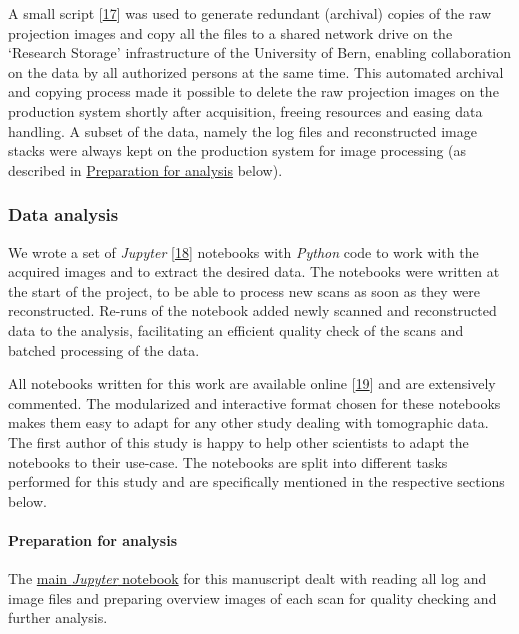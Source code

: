 A small script {[}\protect\hyperlink{ref-ZjgrPHTa}{17}{]} was used to generate redundant (archival) copies of the raw projection images and copy all the files to a shared network drive on the `Research Storage' infrastructure of the University of Bern, enabling collaboration on the data by all authorized persons at the same time.
This automated archival and copying process made it possible to delete the raw projection images on the production system shortly after acquisition, freeing resources and easing data handling.
A subset of the data, namely the log files and reconstructed image stacks were always kept on the production system for image processing (as described in \protect\hyperlink{preparation-for-analysis}{Preparation for analysis} below).

\hypertarget{data-analysis}{%
\subsubsection{Data analysis}\label{data-analysis}}

We wrote a set of \emph{Jupyter} {[}\protect\hyperlink{ref-pQ6Wbz73}{18}{]} notebooks with \emph{Python} code to work with the acquired images and to extract the desired data.
The notebooks were written at the start of the project, to be able to process new scans as soon as they were reconstructed.
Re-runs of the notebook added newly scanned and reconstructed data to the analysis, facilitating an efficient quality check of the scans and batched processing of the data.

All notebooks written for this work are available online {[}\protect\hyperlink{ref-1HteOscVd}{19}{]} and are extensively commented.
The modularized and interactive format chosen for these notebooks makes them easy to adapt for any other study dealing with tomographic data.
The first author of this study is happy to help other scientists to adapt the notebooks to their use-case.
The notebooks are split into different tasks performed for this study and are specifically mentioned in the respective sections below.

\hypertarget{preparation-for-analysis}{%
\paragraph{Preparation for analysis}\label{preparation-for-analysis}}

The \href{https://github.com/habi/EAWAG/blob/master/DisplayFishes.ipynb}{main \emph{Jupyter} notebook} for this manuscript dealt with reading all log and image files and preparing overview images of each scan for quality checking and further analysis.

